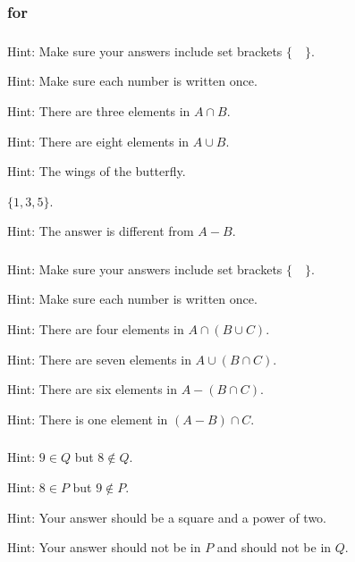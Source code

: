 \subsubsection{\answers for 
\subsetops}

\subsubsection*{ \answers}
    Hint: Make sure your answers include set brackets $\{ \quad \}$.
\begin{apart}
    \item Hint:  Make sure each number is written once.
    \item Hint: There are three elements in $A \cap B$.
    \item Hint: There are eight elements in $A \cup B$.
    \item Hint: The wings of the butterfly.
    \item $\{1,3,5\}$.
    \item Hint: The answer is different from $A-B$.
\end{apart}

\subsubsection*{ \answers}
    Hint: Make sure your answers include set brackets $\{ \quad \}$.
\begin{apart}
    \item Hint:  Make sure each number is written once.
    \item Hint: There are four elements in $A \cap (B\cup C)$.
    \item Hint: There are seven elements in $A \cup (B \cap C)$.
    \item Hint: There are six elements in $A - (B \cap C)$.
    \item Hint: There is one element in $(A-B) \cap C$.
\end{apart}

\subsubsection*{ \answers}
\begin{apart}
    \item Hint: $9 \in Q$ but $8 \notin Q$.
    \item Hint: $8 \in P$ but $9 \notin P$.
    \item Hint: Your answer should be a square and a power of two.
    \item Hint: Your answer should not be in $P$ and should not be in $Q$.
\end{apart}

